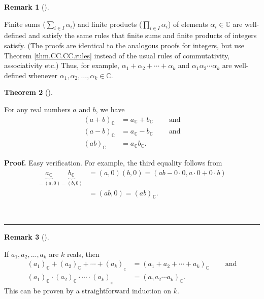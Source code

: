 \documentclass[numbers=enddot,12pt,final,onecolumn,notitlepage]{scrartcl}%
\numberwithin{exer}{subsection}
\theoremstyle{definition}
\newtheorem{theo}{Theorem}[subsection]
\newenvironment{theorem}[1][]
{\begin{theo}[#1]\begin{leftbar}}
{\end{leftbar}\end{theo}}
\newtheorem{remk}[theo]{Remark}
\newenvironment{remark}[1][]
{\begin{remk}[#1]\begin{leftbar}}
{\end{leftbar}\end{remk}}
\newenvironment{proof}[1][Proof]{\noindent\textbf{#1.} }{\ \rule{0.5em}{0.5em}}
\let\sumnonlimits\sum
\let\prodnonlimits\prod
\renewcommand{\sum}{\sumnonlimits\limits}
\renewcommand{\prod}{\prodnonlimits\limits}
\begin{document}
\begin{remark}
Finite sums ($\sum_{i\in I}\alpha_{i}$) and finite products ($\prod_{i\in
I}\alpha_{i}$) of elements $\alpha_{i}\in\mathbb{C}$ are well-defined and
satisfy the same rules that finite sums and finite products of integers
satisfy. (The proofs are identical to the analogous proofs for integers, but
use Theorem \ref{thm.CC.CC.rules} instead of the usual rules of commutativity,
associativity etc.) Thus, for example, $\alpha_{1}+\alpha_{2}+\cdots
+\alpha_{k}$ and $\alpha_{1}\alpha_{2}\cdots\alpha_{k}$ are well-defined
whenever $\alpha_{1},\alpha_{2},\ldots,\alpha_{k}\in\mathbb{C}$.
\end{remark}

\begin{theorem}
For any real numbers $a$ and $b$, we have%
\begin{align*}
\left(  a+b\right)  _{\mathbb{C}}  &  =a_{\mathbb{C}}+b_{\mathbb{C}%
}\ \ \ \ \ \ \ \ \ \ \text{and}\\
\left(  a-b\right)  _{\mathbb{C}}  &  =a_{\mathbb{C}}-b_{\mathbb{C}%
}\ \ \ \ \ \ \ \ \ \ \text{and}\\
\left(  ab\right)  _{\mathbb{C}}  &  =a_{\mathbb{C}}b_{\mathbb{C}}.
\end{align*}

\end{theorem}

\begin{proof}
Easy verification. For example, the third equality follows from%
\begin{align*}
\underbrace{a_{\mathbb{C}}}_{=\left(  a,0\right)  }\underbrace{b_{\mathbb{C}}%
}_{=\left(  b,0\right)  }  &  =\left(  a,0\right)  \left(  b,0\right)
=\left(  ab-0\cdot0,a\cdot0+0\cdot b\right) \\
&  =\left(  ab,0\right)  =\left(  ab\right)  _{\mathbb{C}}.
\end{align*}

\end{proof}

\begin{remark}
If $a_{1},a_{2},\ldots,a_{k}$ are $k$ reals, then
\begin{align*}
\left(  a_{1}\right)  _{\mathbb{C}}+\left(  a_{2}\right)  _{\mathbb{C}}%
+\cdots+\left(  a_{k}\right)  _{_{\mathbb{C}}}  &  =\left(  a_{1}+a_{2}%
+\cdots+a_{k}\right)  _{\mathbb{C}}\ \ \ \ \ \ \ \ \ \ \text{and}\\
\left(  a_{1}\right)  _{\mathbb{C}}\cdot\left(  a_{2}\right)  _{\mathbb{C}%
}\cdot\cdots\cdot\left(  a_{k}\right)  _{_{\mathbb{C}}}  &  =\left(
a_{1}a_{2}\cdots a_{k}\right)  _{\mathbb{C}}.
\end{align*}
This can be proven by a straightforward induction on $k$.
\end{remark}
\end{document}
